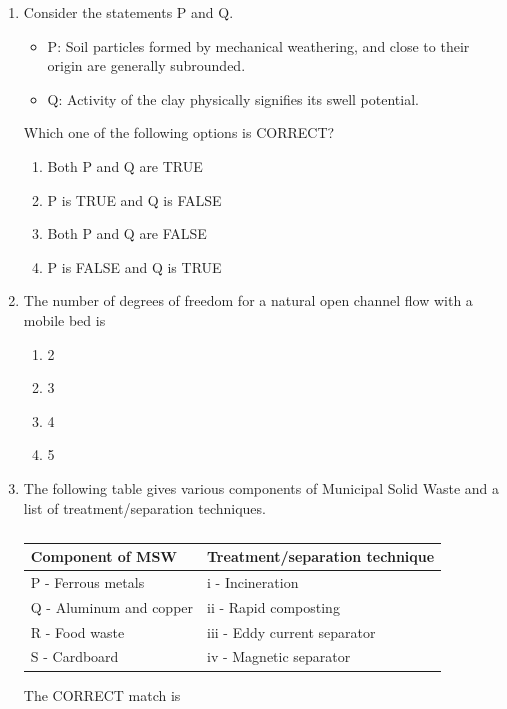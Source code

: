 \documentclass[journal,12pt,onecolumn]{article}
\theoremstyle{remark}
\begin{document}
\begin{enumerate}
    \item Consider the statements P and Q.
    \begin{itemize}
    \item P: Soil particles formed by mechanical weathering, and close to their origin are generally subrounded.
    \item Q: Activity of the clay physically signifies its swell potential.
    \end{itemize}
    Which one of the following options is CORRECT?

    \hfill{}
    \begin{enumerate}
        \item Both P and Q are TRUE
        \item P is TRUE and Q is FALSE
        \item Both P and Q are FALSE
        \item P is FALSE and Q is TRUE
    \end{enumerate}

    \item The number of degrees of freedom for a natural open channel flow with a mobile bed is
    
    \hfill{}
    \begin{enumerate}
        \item 2
        \item 3
        \item 4
        \item 5
    \end{enumerate}

    \item The following table gives various components of Municipal Solid Waste  and a list of treatment/separation techniques.
    \begin{table}[H]
        \centering
        \begin{tabular}{|l|l|}
            \hline
            \textbf{Component of MSW} & \textbf{Treatment/separation technique} \\
            \hline
            P - Ferrous metals & i - Incineration \\
            Q - Aluminum and copper & ii - Rapid composting \\
            R - Food waste & iii - Eddy current separator \\
            S - Cardboard & iv - Magnetic separator \\
            \hline
        \end{tabular}
        \caption{}
        \label{tab:q21}
    \end{table}
    The CORRECT match is


\end{enumerate}
\end{document}
